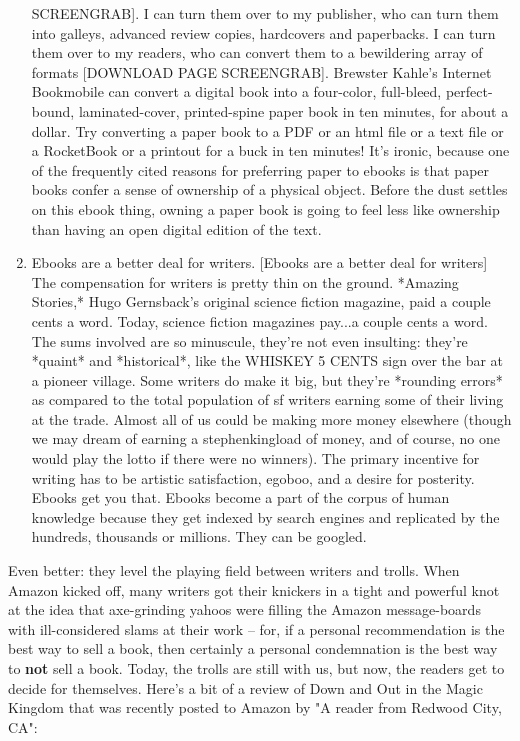 \begin{enumerate}
  SCREENGRAB]. I can turn them over to my publisher, who can turn
  them into galleys, advanced review copies, hardcovers and
  paperbacks. I can turn them over to my readers, who can convert
  them to a bewildering array of formats [DOWNLOAD PAGE SCREENGRAB].
  Brewster Kahle's Internet Bookmobile can convert a digital book
  into a four-color, full-bleed, perfect-bound, laminated-cover,
  printed-spine paper book in ten minutes, for about a dollar. Try
  converting a paper book to a PDF or an html file or a text file or
  a RocketBook or a printout for a buck in ten minutes! It's ironic,
  because one of the frequently cited reasons for preferring paper to
  ebooks is that paper books confer a sense of ownership of a
  physical object. Before the dust settles on this ebook thing,
  owning a paper book is going to feel less like ownership than
  having an open digital edition of the text.
\item
  Ebooks are a better deal for writers. [Ebooks are a better deal for
  writers] The compensation for writers is pretty thin on the ground.
  *Amazing Stories,* Hugo Gernsback's original science fiction
  magazine, paid a couple cents a word. Today, science fiction
  magazines pay...a couple cents a word. The sums involved are so
  minuscule, they're not even insulting: they're *quaint* and
  *historical*, like the WHISKEY 5 CENTS sign over the bar at a
  pioneer village. Some writers do make it big, but they're *rounding
  errors* as compared to the total population of sf writers earning
  some of their living at the trade. Almost all of us could be making
  more money elsewhere (though we may dream of earning a
  stephenkingload of money, and of course, no one would play the
  lotto if there were no winners). The primary incentive for writing
  has to be artistic satisfaction, egoboo, and a desire for
  posterity. Ebooks get you that. Ebooks become a part of the corpus
  of human knowledge because they get indexed by search engines and
  replicated by the hundreds, thousands or millions. They can be
  googled.
\end{enumerate}
Even better: they level the playing field between writers and
trolls. When Amazon kicked off, many writers got their knickers in
a tight and powerful knot at the idea that axe-grinding yahoos were
filling the Amazon message-boards with ill-considered slams at
their work -- for, if a personal recommendation is the best way to
sell a book, then certainly a personal condemnation is the best way
to \textbf{not} sell a book. Today, the trolls are still with us,
but now, the readers get to decide for themselves. Here's a bit of
a review of Down and Out in the Magic Kingdom that was recently
posted to Amazon by "A reader from Redwood City, CA":

